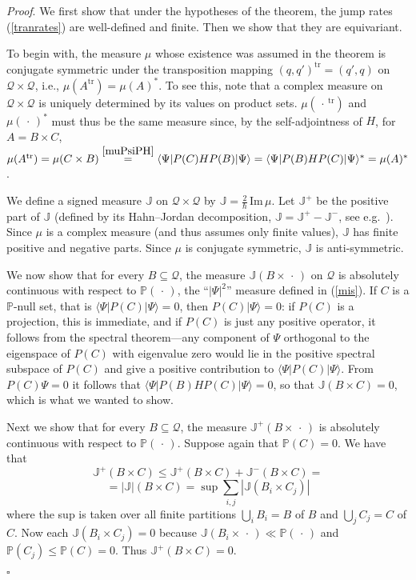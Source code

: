 \documentclass[12pt]{article}
\newcommand{\1}{\mathbf{1}} %
\newcommand{\tr}{\mathrm{tr}} %
\renewcommand{\Im}{\mathrm{Im}} %
\renewcommand{\sp}[2]{\langle #1 | #2 \rangle} %
\newcommand{\conf}{\mathcal{Q}} %
\newcommand{\measure}{\mathbb{P}} %
\newcommand{\current}{\mathbb{J}}
\newcommand{\pov}{{P}}%
\newenvironment{proof}{\noindent 
\textit{Proof}.}{\hfill$\square$\bigskip}
\begin{document}
\begin{proof}
We first show that under the hypotheses of the theorem, the jump rates
(\ref{tranrates}) are well-defined and finite.  Then we show that they
are equivariant.

To begin with, the measure $\mu$ whose existence was assumed in the
theorem is conjugate symmetric under the transposition mapping
$(q,q')^\tr = (q',q)$ on $\conf \times \conf$, i.e., $\mu(A^\tr) =
\mu(A)^*$. To see this, note that a complex measure on $\conf \times
\conf$ is uniquely determined by its values on product
sets. $\mu(\,\cdot\,^\tr)$ and $\mu(\,\cdot\,)^*$ must thus be the
same measure since, by the self-adjointness of $H$, for $A = B \times
C$, $\mu(A^\tr) = \mu(C \times B) \stackrel{\eqref{muPsiPH}}{=}
\sp{\Psi}{\pov(C) H \pov(B) |\Psi} = \sp{\Psi}{\pov(B) H \pov(C)
|\Psi}^* = \mu(A)^*$.

We define a signed measure $\current$ on $\conf \times \conf$ by
$\current = \frac{2}{\hbar} \, \Im \, \mu$. Let $\current^+$ be the
positive part of $\current$ (defined by its Hahn--Jordan
decomposition, $\current = \current^+ - \current^-$, see e.g.\
\cite[p.~120]{Halmos}). Since $\mu$ is a complex measure (and thus
assumes only finite values), $\current$ has finite positive and
negative parts. Since $\mu$ is conjugate symmetric, $\current$ is
anti-symmetric.

We now show that for every $B\subseteq \conf$, the measure
$\current(B\times \,\cdot\,)$ on $\conf$ is absolutely continuous with
respect to $\measure(\,\cdot\,)$, the ``$|\Psi|^2$'' measure defined
in (\ref{mis}). If $C$ is a $\measure$-null set, that is $\sp{\Psi}
{\pov(C)| \Psi}=0$, then $\pov(C)|\Psi\rangle =0$: if $\pov(C)$ is a
projection, this is immediate, and if $\pov(C)$ is just any positive
operator, it follows from the spectral theorem---any component of
$\Psi$ orthogonal to the eigenspace of $\pov(C)$ with eigenvalue zero
would lie in the positive spectral subspace of $\pov(C)$ and give a
positive contribution to $\sp{\Psi}{\pov(C)| \Psi}$. {}From $\pov(C)
\Psi =0$ it follows that $\sp{ \Psi}{\pov(B) H \pov(C) |\Psi} =0$, so
that $\current(B \times C) =0$, which is what we wanted to show.

Next we show that for every $B \subseteq \conf$, the measure
$\current^+(B \times \,\cdot\,)$ is absolutely continuous with respect
to $\measure(\,\cdot\,)$. Suppose again that $\measure(C)=0$.  We have
that
\[
  \current^+(B\times C) \leq \current^+(B\times C) +
  \current^-(B\times C)=
\]
\[
  = |\current|(B\times C) = \sup \sum_{i,j} |\current(B_i\times C_j)|
\]
where the sup is taken over all finite partitions $\bigcup_i B_i = B$
of $B$ and $\bigcup_j C_j = C$ of $C$. Now each $\current(B_i\times
C_j) =0$ because $\current(B_i \times \,\cdot\,) \ll
\measure(\,\cdot\,)$ and $\measure(C_j) \leq \measure(C) =0$. Thus
$\current^+(B\times C) = 0$.


\end{proof}
\end{document}
